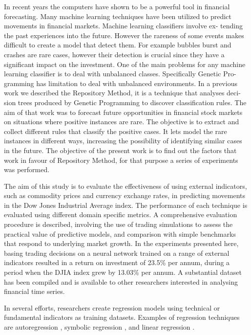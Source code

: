 \cite{Garcia-Almanza2006} In recent years the computers have shown to be a
powerful tool in financial forecasting. Many machine learning techniques have
been utilized to predict movements in financial markets. Machine learning
classifiers involve ex- tending the past experiences into the future. However
the rareness of some events makes difficult to create a model that detect
them. For example bubbles burst and crashes are rare cases, however their
detection is crucial since they have a significant impact on the investment. One
of the main problems for any machine learning classifier is to deal with
unbalanced classes. Specifically Genetic Pro- gramming has limitation to deal
with unbalanced environments. In a previous work we described the Repository
Method, it is a technique that analyses deci- sion trees produced by Genetic
Programming to discover classification rules. The aim of that work was to
forecast future opportunities in financial stock markets on situations where
positive instances are rare. The objective is to extract and collect different
rules that classify the positive cases. It lets model the rare instances in
different ways, increasing the possibility of identifying similar cases in the
future. The objective of the present work is to find out the factors that work
in favour of Repository Method, for that purpose a series of experiments was
performed.

\cite{Connor2005} The aim of this study is to evaluate the effectiveness of
using external indicators, such as commodity prices and currency exchange rates,
in predicting movements in the Dow Jones Industrial Average index. The
performance of each technique is evaluated using different domain specific
metrics. A comprehensive evaluation procedure is described, involving the use of
trading simulations to assess the practical value of predictive models, and
comparison with simple benchmarks that respond to underlying market growth. In
the experiments presented here, basing trading decisions on a neural network
trained on a range of external indicators resulted in a return on investment of
23.5\% per annum, during a period when the DJIA index grew by 13.03\% per
annum. A substantial dataset has been compiled and is available to other
researchers interested in analysing financial time series.

In several efforts, researchers create regression models using technical or
fundamental indicators as training datasets. Examples of regression techniques
are autoregression \cite{burg1968new}, symbolic regression
\cite{billard2002symbolic}, and linear regression \cite{kutner2004applied}.


